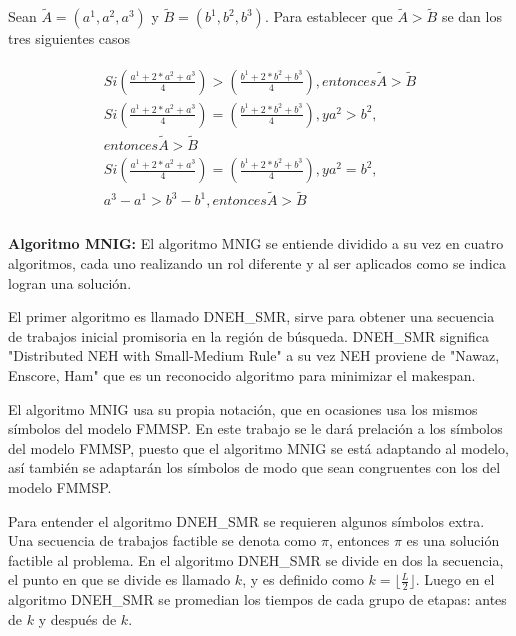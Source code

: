 \documentclass{article}
\begin{document}
Sean $\tilde{A} = (a^1,a^2,a^3)$ y $\tilde{B} = (b^1,b^2,b^3)$. Para establecer que $\tilde{A} > \tilde{B}$ se dan los tres siguientes casos

\begin{align}
\begin{split}
    Si \left(\frac{a^1+2*a^2+a^3}{4}\right) > 
    \left(\frac{b^1+2*b^2+b^3}{4}\right), entonces \tilde{A} > \tilde{B}\\
    Si \left(\frac{a^1+2*a^2+a^3}{4}\right) = \left(\frac{b^1+2*b^2+b^3}{4}\right),
    y a^2 > b^2,\\ entonces \tilde{A} > \tilde{B}\\
    Si \left(\frac{a^1+2*a^2+a^3}{4}\right) = \left(\frac{b^1+2*b^2+b^3}{4}\right),
    y a^2 = b^2,\\ a^3-a^1 > b^3-b^1, entonces \tilde{A} > \tilde{B}\\
\end{split}
\end{align}

\vspace{\baselineskip}
\textbf{Algoritmo MNIG:} El algoritmo MNIG se entiende dividido a su vez en cuatro algoritmos, cada uno realizando un rol diferente y al ser aplicados como se indica logran una solución. \autocite{algMNIG}

\vspace{\baselineskip}
El primer algoritmo es llamado DNEH\_SMR, sirve para obtener una secuencia de trabajos inicial promisoria en la región de búsqueda. DNEH\_SMR significa "Distributed NEH with Small-Medium Rule" a su vez NEH proviene de "Nawaz, Enscore, Ham" que es un reconocido algoritmo para minimizar el makespan. \autocite{algMNIG}

\vspace{\baselineskip}
El algoritmo MNIG usa su propia notación, que en ocasiones usa los mismos símbolos del modelo FMMSP. En este trabajo se le dará prelación a los símbolos del modelo FMMSP, puesto que el algoritmo MNIG se está adaptando al modelo, así también se adaptarán los símbolos de modo que sean congruentes con los del modelo FMMSP.

\vspace{\baselineskip}
Para entender el algoritmo DNEH\_SMR se requieren algunos símbolos extra. Una secuencia de trabajos factible se denota como $\pi$, entonces $\pi$ es una solución factible al problema. En el algoritmo DNEH\_SMR se divide en dos la secuencia, el punto en que se divide es llamado $k$, y es definido como $k = \lfloor\frac{L}{2}\rfloor$. Luego en el algoritmo DNEH\_SMR se promedian los tiempos de cada grupo de etapas: antes de $k$ y después de $k$. \autocite{algMNIG}
\end{document}
